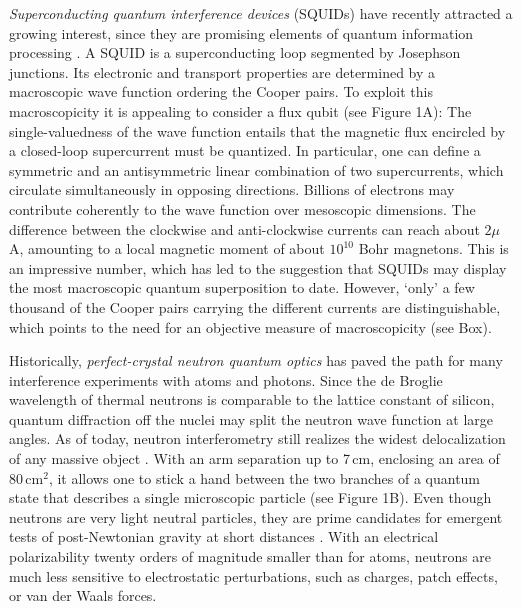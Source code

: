 \documentclass[12pt]{article}
\begin{document}
\emph{Superconducting quantum interference devices }(SQUIDs) have recently attracted a growing interest, since they are promising
elements of quantum information processing \cite{Devoret2013}. A SQUID is a superconducting loop segmented by Josephson junctions.
Its electronic and transport properties are determined by 
a macroscopic wave function
ordering the Cooper pairs.
To exploit this 
macroscopicity it is appealing to consider a flux qubit\cite{Clarke2008} (see Figure 1A):
The single-valuedness of the wave function entails that the magnetic flux encircled by a closed-loop supercurrent must be quantized.
In particular, one can  define a symmetric and an antisymmetric linear combination of two supercurrents, which 
circulate simultaneously in opposing directions.
Billions of electrons may contribute coherently to the wave function over mesoscopic dimensions.
The difference between the clockwise and anti-clockwise currents\cite{Friedman2000_long} can reach about $2\mu$A,
amounting to a  local magnetic moment of about $10^{10}$
Bohr magnetons.
This is an impressive number, which has led to the suggestion that SQUIDs may display the most macroscopic quantum superposition to date.
However, `only' a few thousand of the Cooper pairs carrying the different currents are distinguishable\cite{Korsbakken2010}, which points to the need for an objective measure of macroscopicity (see Box).

Historically, \emph{perfect-crystal neutron quantum optics} \cite{Rauch1974} has paved the path for many interference experiments with atoms and photons.
Since the de Broglie wavelength of thermal neutrons is comparable
to the lattice constant of silicon, quantum diffraction off the nuclei may split the neutron wave function at large angles.
As of today, neutron interferometry still realizes the widest delocalization
of any massive object \cite{Zawisky2002}. With an arm separation up to 7\,cm, enclosing an area of 80\,cm$^2$,
it allows one to stick a hand between 
the two branches of a quantum state that describes a single microscopic particle (see Figure 1B).
Even though neutrons are very light neutral particles,
they are prime candidates for emergent tests of post-Newtonian gravity at short distances \cite{Nesvizhevsky2002,Jenke2011}.
With an electrical polarizability twenty orders of magnitude smaller than for atoms, neutrons are much less sensitive to electrostatic perturbations, such as charges, patch effects, or van der Waals forces.
\end{document}
